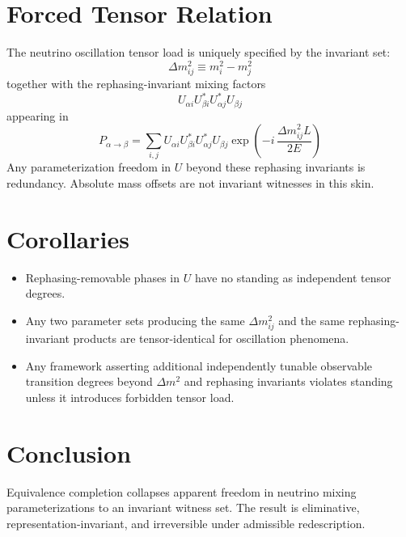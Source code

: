 ﻿\documentclass[11pt]{article}
\begin{document}
\section{Forced Tensor Relation}
The neutrino oscillation tensor load is uniquely specified by the invariant set:
\begin{equation}
\boxed{\;\Delta m_{ij}^2 \equiv m_i^2 - m_j^2\;}
\end{equation}
together with the rephasing-invariant mixing factors
\begin{equation}
\boxed{\;U_{\alpha i}U_{\beta i}^*U_{\alpha j}^*U_{\beta j}\;}
\end{equation}
appearing in
\begin{equation}
\boxed{\;
P_{\alpha\to\beta}
=\sum_{i,j} U_{\alpha i}U_{\beta i}^*U_{\alpha j}^*U_{\beta j}
\exp\!\left(-i\,\frac{\Delta m_{ij}^2 L}{2E}\right)
\;}
\end{equation}
Any parameterization freedom in $U$ beyond these rephasing invariants is redundancy. Absolute mass offsets are not invariant witnesses in this skin.

\section{Corollaries}
\begin{itemize}
\item Rephasing-removable phases in $U$ have no standing as independent tensor degrees.
\item Any two parameter sets producing the same $\Delta m_{ij}^2$ and the same rephasing-invariant products are tensor-identical for oscillation phenomena.
\item Any framework asserting additional independently tunable observable transition degrees beyond $\Delta m^2$ and rephasing invariants violates standing unless it introduces forbidden tensor load.
\end{itemize}

\section*{Conclusion}
Equivalence completion collapses apparent freedom in neutrino mixing parameterizations to an invariant witness set. The result is eliminative, representation-invariant, and irreversible under admissible redescription.
\end{document}
